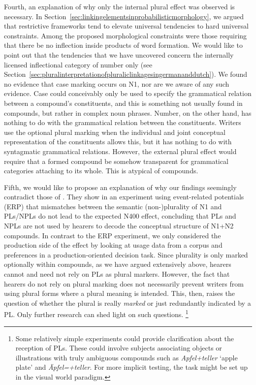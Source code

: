 Fourth, an explanation of why only the internal plural effect was observed is necessary.
In Section~\ref{sec:linkingelementsinprobabilisticmorphology}, we argued that restrictive frameworks tend to elevate universal tendencies to hard universal constraints.
Among the proposed morphological constraints were those requiring that there be no inflection inside products of word formation.
We would like to point out that the tendencies that we have uncovered concern the internally licensed inflectional category of number only (see Section~\ref{sec:pluralinterpretationofpluraliclinkagesingermananddutch}).
We found no evidence that case marking occurs on N1, nor are we aware of any such evidence.
Case could conceivably only be used to specify the grammatical relation between a compound's constituents, and this is something not usually found in compounds, but rather in complex noun phrases.
Number, on the other hand, has nothing to do with the grammatical relation between the constituents.
Writers use the optional plural marking when the individual and joint conceptual representation of the constituents allows this, but it has nothing to do with syntagmatic grammatical relations.
However, the external plural effect would require that a formed compound be somehow transparent for grammatical categories attaching to its whole.
This is atypical of compounds.

Fifth, we would like to propose an explanation of why our findings seemingly contradict those of \textcite{KoesterEa2004}.
They show in an experiment using event-related potentials (ERP) that mismatches between the semantic (non-)plurality of N1 and PLs\slash NPLs do not lead to the expected N400 effect, concluding that PLs and NPLs are not used by hearers to decode the conceptual structure of N1+N2 compounds.
In contrast to the ERP experiment, we only considered the production side of the effect by looking at usage data from a corpus and preferences in a production-oriented decision task.
Since plurality is only marked optionally within compounds, as we have argued extensively above, hearers cannot and need not rely on PLs as plural markers.
However, the fact that hearers do not rely on plural marking does not necessarily prevent writers from using plural forms where a plural meaning is intended.
This, then, raises the question of whether the plural is really \textit{marked} or just redundantly indicated by a PL.
Only further research can shed light on such questions.%
\footnote{Some relatively simple experiments could provide clarification about the reception of PLs.
These could involve subjects associating objects or illustrations with truly ambiguous compounds such as \textit{Apfel+teller} `apple plate' and \textit{Äpfel=+teller}.
For more implicit testing, the task might be set up in the visual world paradigm.}

